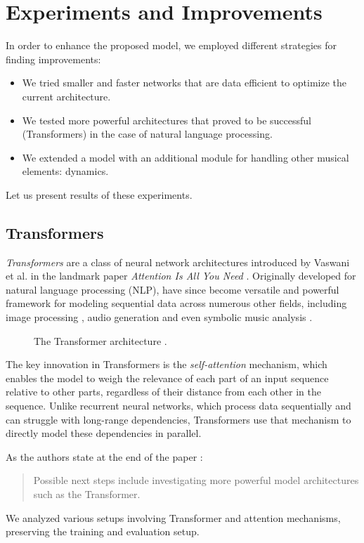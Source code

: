 \chapter{Experiments and Improvements}\label{experiments_and_improvements}

In order to enhance the proposed model, we employed different strategies for finding improvements: \begin{itemize}
	\item We tried smaller and faster networks that are data efficient to optimize the current architecture.
	\item We tested more powerful architectures that proved to be successful (Transformers) in the case of natural language processing.
	\item We extended a model with an additional module for handling other musical elements: dynamics.\end{itemize}
	
Let us present results of these experiments.

\section{Transformers}

\emph{Transformers} are a class of neural network architectures introduced by Vaswani et al. in the landmark paper \emph{Attention Is All You Need} \cite{Vaswani2017}. Originally developed for natural language processing (NLP), have since become versatile and powerful framework for modeling sequential data across numerous other fields, including image processing \cite{Dosovitskiy2020}, audio generation \cite{Borsos2023} and even symbolic music analysis \cite{Zhu2021}.

\begin{figure}[ht!]
\centering

\caption[The Transformer architecture.]{The Transformer architecture \cite{Vaswani2017}.}
\end{figure}

The key innovation in Transformers is the \emph{self-attention} mechanism, which enables the model to weigh the relevance of each part of an input sequence relative to other parts, regardless of their distance from each other in the sequence. Unlike recurrent neural networks, which process data sequentially and can struggle with long-range dependencies, Transformers use that mechanism to directly model these dependencies in parallel.

As the authors state at the end of the paper \cite{Liu2022}: \begin{quote}Possible next steps include investigating more powerful model architectures such as the Transformer.\end{quote} We analyzed various setups involving Transformer and attention mechanisms, preserving the training and evaluation setup.

